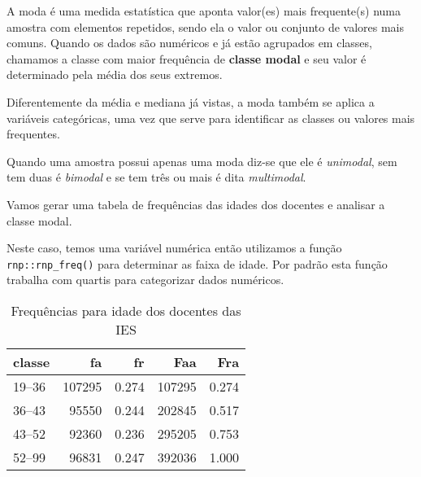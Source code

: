 \documentclass[11pt,]{style/krantz}
\makeatletter
\newenvironment{Shaded}{\begin{snugshade}}{\end{snugshade}}
\newcommand{\DataTypeTok}[1]{\textcolor[rgb]{0.13,0.29,0.53}{#1}}
\newcommand{\DecValTok}[1]{\textcolor[rgb]{0.00,0.00,0.81}{#1}}
\newcommand{\KeywordTok}[1]{\textcolor[rgb]{0.13,0.29,0.53}{\textbf{#1}}}
\newcommand{\NormalTok}[1]{#1}
\newcommand{\OperatorTok}[1]{\textcolor[rgb]{0.81,0.36,0.00}{\textbf{#1}}}
\newcommand{\OtherTok}[1]{\textcolor[rgb]{0.56,0.35,0.01}{#1}}
\newcommand{\StringTok}[1]{\textcolor[rgb]{0.31,0.60,0.02}{#1}}
\renewenvironment{quote}{\begin{VF}}{\end{VF}}
\newenvironment{kframe}{%
\medskip{}
\setlength{\fboxsep}{.8em}
 \def\at@end@of@kframe{}%
 \ifinner\ifhmode%
  \def\at@end@of@kframe{\end{minipage}}%
  \begin{minipage}{\columnwidth}%
 \fi\fi%
 \def\FrameCommand##1{\hskip\@totalleftmargin \hskip-\fboxsep
 \colorbox{shadecolor}{##1}\hskip-\fboxsep
     \hskip-\linewidth \hskip-\@totalleftmargin \hskip\columnwidth}%
 \MakeFramed {\advance\hsize-\width
   \@totalleftmargin\z@ \linewidth\hsize
   \@setminipage}}%
 {\par\unskip\endMakeFramed%
 \at@end@of@kframe}
\renewenvironment{Shaded}{\begin{kframe}}{\end{kframe}}
\theoremstyle{definition}
\theoremstyle{definition}
\theoremstyle{definition}
\theoremstyle{remark}
\let\BeginKnitrBlock\begin \let\EndKnitrBlock\end
\makeatother
\begin{document}
A moda é uma medida estatística que aponta valor(es) mais frequente(s) numa amostra com elementos repetidos, sendo ela o valor ou conjunto de valores mais comuns. Quando os dados são numéricos e já estão agrupados em classes, chamamos a classe com maior frequência de \textbf{classe modal} e seu valor é determinado pela média dos seus extremos.

\begin{quote}
Diferentemente da média e mediana já vistas, a moda também se aplica a variáveis categóricas, uma vez que serve para identificar as classes ou valores mais frequentes.
\end{quote}

Quando uma amostra possui apenas uma moda diz-se que ele é \emph{unimodal}, sem tem duas é \emph{bimodal} e se tem três ou mais é dita \emph{multimodal}.

\BeginKnitrBlock{example}
\protect\hypertarget{exm:unnamed-chunk-54}{}{\label{exm:unnamed-chunk-54} }Vamos gerar uma tabela de frequências das idades dos docentes e analisar a classe modal.
\EndKnitrBlock{example}

\BeginKnitrBlock{solution}
\iffalse{} {Solução. } \fi{}Neste caso, temos uma variável numérica então utilizamos a função \texttt{rnp::rnp\_freq()} para determinar as faixa de idade. Por padrão esta função trabalha com quartis para categorizar dados numéricos.
\EndKnitrBlock{solution}

\begin{Shaded}
\end{Shaded}

\begin{table}[!h]

\caption{\label{tab:tab08}Frequências para idade dos docentes das IES}
\centering
\begin{tabular}{lrrrr}
\toprule
classe & fa & fr & Faa & Fra\\
\midrule
19--36 & 107295 & 0.274 & 107295 & 0.274\\
36--43 & 95550 & 0.244 & 202845 & 0.517\\
43--52 & 92360 & 0.236 & 295205 & 0.753\\
52--99 & 96831 & 0.247 & 392036 & 1.000\\
\bottomrule
\end{tabular}
\end{table}
\end{document}
